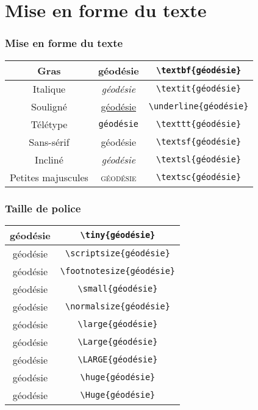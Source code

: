 \section{Mise en forme du texte}

\begin{frame}[containsverbatim]
    \frametitle{Mise en forme du texte}
    \begin{table}
        \centering
        \begin{tabular}{|c||c|c|}
            \hline
            Gras     & \textbf{géodésie}    & \verb|\textbf{géodésie}| \\
            \hline
            Italique & \textit{géodésie}    & \verb|\textit{géodésie}| \\
            \hline
            Souligné & \underline{géodésie} & \verb|\underline{géodésie}| \\
            \hline
            Télétype & \texttt{géodésie} & \verb|\texttt{géodésie}| \\
            \hline
            Sans-sérif & \textsf{géodésie} & \verb|\textsf{géodésie}| \\
            \hline
            Incliné & \textsl{géodésie} & \verb|\textsl{géodésie}| \\
            \hline
            Petites majuscules & \textsc{géodésie} & \verb|\textsc{géodésie}| \\
            \hline
        \end{tabular}
    \end{table}
\end{frame}

\begin{frame}[containsverbatim]
    \frametitle{Taille de police}
    \begin{table}
        \centering
        \begin{tabular}{|c|c|}
            \hline
            \tiny{géodésie} & \verb|\tiny{géodésie}| \\
            \hline
            \scriptsize{géodésie} & \verb|\scriptsize{géodésie}| \\
            \hline
            \footnotesize{géodésie} & \verb|\footnotesize{géodésie}| \\
            \hline
            \small{géodésie} & \verb|\small{géodésie}| \\
            \hline
            \normalsize{géodésie} & \verb|\normalsize{géodésie}| \\
            \hline
            \large{géodésie} & \verb|\large{géodésie}| \\
            \hline
            \Large{géodésie} & \verb|\Large{géodésie}| \\
            \hline
            \LARGE{géodésie} & \verb|\LARGE{géodésie}| \\
            \hline
            \huge{géodésie} & \verb|\huge{géodésie}| \\
            \hline
            \Huge{géodésie} & \verb|\Huge{géodésie}| \\
            \hline
        \end{tabular}
    \end{table}
\end{frame}

